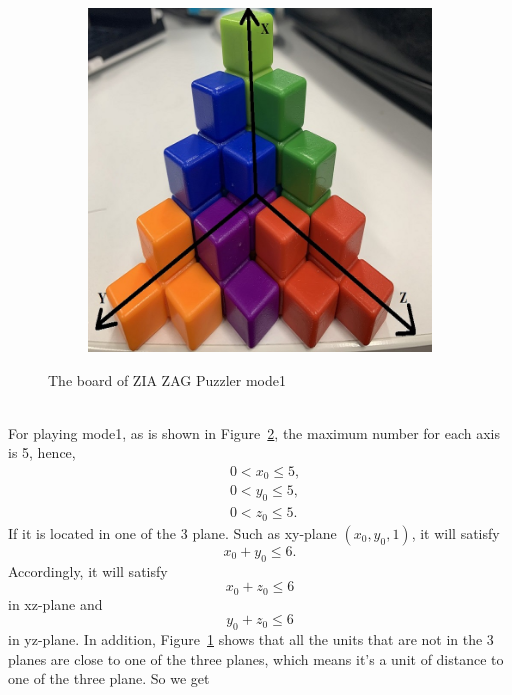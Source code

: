 \begin{figure}[htbp]
\begin{subfigure}[b]{.3\textwidth}
\includegraphics[width=\textwidth]{figs/3Dboard1.jpg}
\caption{}
\label{figure:mode1B}
\end{subfigure}
\caption{The board of ZIA ZAG Puzzler mode1}
  \label{fig:board1}
\end{figure}
\\For playing mode1, as is shown in Figure~\ref{fig:board1}, the maximum number for each axis is 5, hence,
\begin{equation}
\begin{aligned}
&0<x_{0}\leq5,\\
&0<y_{0}\leq5,\\
&0<z_{0}\leq5.
\end{aligned}
\end{equation}
If it is located in one of the 3 plane. Such as xy-plane $(x_{0},y_{0},1)$, it will satisfy
\begin{equation}
x_{0}+y_{0}\leq6.
\end{equation}
Accordingly, it will satisfy 
\begin{equation}
x_{0}+z_{0}\leq6
\end{equation}
in xz-plane and 
\begin{equation}
y_{0}+z_{0}\leq6
\end{equation}
in yz-plane. In addition, Figure~\ref{figure:mode1B} shows that all the units that are not in the 3 planes are close to one of the three planes, which means it's a unit of distance to one of the three plane. So we get
